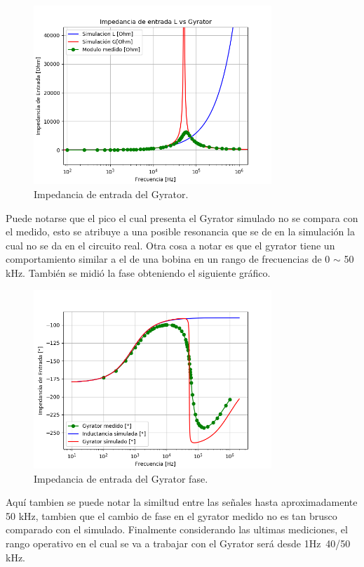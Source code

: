 \begin{figure}[H]	
	\centering
	\includegraphics[width=0.8\textwidth]{ImagenesEj2/ZinG.png}
	\caption{Impedancia de entrada del Gyrator.}
	\label{fig:ZinG}
\end{figure}
Puede notarse que el pico el cual presenta el Gyrator simulado no se compara con el medido, esto se atribuye a una posible resonancia que se de en la simulación la cual no se da en el circuito real. Otra cosa a notar es que el gyrator tiene un comportamiento similar a el de una bobina en un rango de frecuencias de 0 $\sim$ 50 kHz.
También se midió la fase obteniendo el siguiente gráfico.
\begin{figure}[H]	
	\centering
	\includegraphics[width=0.8\textwidth]{ImagenesEj2/ZinGp.png}
	\caption{Impedancia de entrada del Gyrator fase.}
	\label{fig:ZinGp}
\end{figure}
 Aquí tambien se puede notar la similtud entre las señales hasta aproximadamente 50 kHz, tambien que el cambio de fase en el gyrator medido no es tan brusco comparado  con el simulado.
Finalmente considerando las ultimas mediciones, el rango operativo en el cual se va  a trabajar con el Gyrator será desde 1Hz~40/50 kHz.
